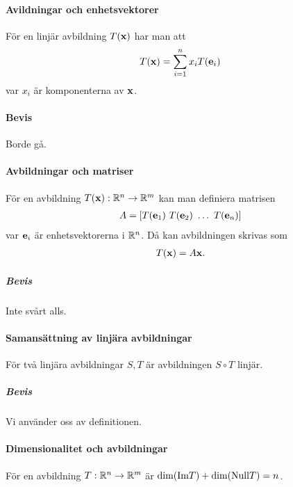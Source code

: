 \paragraph{Avildningar och enhetsvektorer}
För en linjär avbildning $T(\vect{x})$ har man att
\begin{align*}
	T(\vect{x}) = \sum\limits_{i = 1}^{n} x_iT(\vect{e}_i)
\end{align*}
var $x_i$ är komponenterna av $\vect{x}$.

\paragraph{Bevis}
Borde gå.

\paragraph{Avbildningar och matriser}
För en avbildning $T(\vect{x}): \R^n\to\R^m$ kan man definiera matrisen
\begin{align*}
	A = \left[ T(\vect{e}_1) ~ T(\vect{e}_2) ~ \dots ~ T(\vect{e}_n) \right]
\end{align*}
var $\vect{e}_i$ är enhetsvektorerna i $\mathbb{R}^n$. Då kan avbildningen skrivas som
\begin{align*}
	T(\vect{x}) = A\vect{x}.
\end{align*}

\subparagraph{Bevis}
Inte svårt alls.

\paragraph{Samansättning av linjära avbildningar}
För två linjära avbildningar $S, T$ är avbildningen $S\circ T$ linjär.

\subparagraph{Bevis}
Vi använder oss av definitionen.

\paragraph{Dimensionalitet och avbildningar}
För en avbildning $T: \mathbb{R}^n\to\mathbb{R}^m$ är $\text{dim}(\text{Im} T) + \text{dim}(\text{Null} T) = n$.